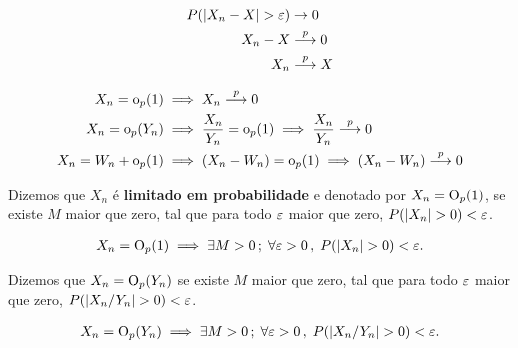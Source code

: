 \documentclass[11pt, oneside, a4paper, article]{article}
\numberwithin{equation}{section}
\begin{document}
\begin{description}
\begin{description}
\begin{defn}
\begin{align*}
P( | X_{n} - X | > \varepsilon ) & \to 0
\\
X_{n} - X &  \overset{p}{\longrightarrow}  0
\\
X_{n} &  \overset{p}{\longrightarrow}  X
\end{align*}
\end{defn}

\begin{defn}[$\litop$]
\begin{align*}
X_{n} = \text{o}_{p}(1) & \implies X_{n}  \overset{p}{\longrightarrow}  0
\\
X_{n} = \text{o}_{p}(Y_{n}) & \implies
\frac{X_{n}}{Y_{n}} = \text{o}_{p}(1) \implies
\frac{X_{n}}{Y_{n}}  \overset{p}{\longrightarrow}  0
\\
X_{n} = W_{n} + \text{o}_{p}(1) & \implies
(X_{n} - W_{n}) = \text{o}_{p}(1) \implies
(X_{n} - W_{n})  \overset{p}{\longrightarrow}  0
\end{align*}
\end{defn}

\begin{defn}
Dizemos que $X_{n}$ é \textbf{limitado em probabilidade} e denotado por 
$X_{n} = \text{O}_{p}(1)$,
se existe $M$ maior que zero, tal que para todo $\varepsilon$ maior que zero, $P( | X_{n} | > 0) < \varepsilon$.

\vspace{-1 em}
\begin{align*}
X_{n} = \text{O}_{p}(1) \implies \exists M > 0 \, ; \;
\forall \varepsilon > 0 \, , \;
P( | X_{n} | > 0) < \varepsilon.
\end{align*}
\end{defn}

\begin{defn}
Dizemos que
$X_{n} = \text{O}_{p}(Y_{n})$ se existe $M$ maior que zero, tal que para todo $\varepsilon$ maior que zero, $P( | X_{n}/Y_{n} | > 0) < \varepsilon$.

\vspace{-1 em}
\begin{align*}
X_{n} = \text{O}_{p}(Y_{n}) \implies \exists M > 0 \, ; \;
\forall \varepsilon > 0 \, , \;
P( | X_{n}/Y_{n} | > 0) < \varepsilon.
\end{align*}
\end{defn}


\end{description}
\end{description}
\end{document}
